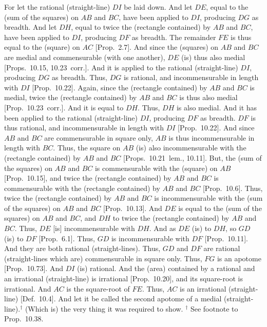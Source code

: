 For let the rational (straight-line) $DI$ be laid down. And let $DE$, equal
to the (sum of the squares) on $AB$ and $BC$, have been applied to
$DI$, producing $DG$ as breadth. And let $DH$, equal to twice the
(rectangle contained) by $AB$ and $BC$, have been applied to $DI$,
producing $DF$ as breadth. The remainder $FE$ is thus equal to the
(square) on $AC$ [Prop.~2.7]. And since the
(squares) on $AB$ and $BC$ are medial and commensurable (with one another), $DE$ (is) thus also medial [Props.~10.15, 10.23~corr.]. And it is applied to the
rational (straight-line) $DI$, producing $DG$ as breadth. Thus, $DG$
is rational, and incommensurable in length with $DI$ [Prop.~10.22].  Again, since the (rectangle contained)
by $AB$ and $BC$ is medial, twice the (rectangle contained) by $AB$
and $BC$ is thus also medial [Prop.~10.23~corr.]. 
And it is equal to $DH$. Thus, $DH$ is also medial. And it has been
applied to the rational (straight-line) $DI$, producing $DF$ as breadth.
$DF$ is thus rational, and incommensurable in length with $DI$
[Prop.~10.22].  And since $AB$ and $BC$ are commensurable in square only, $AB$ is thus incommensurable in length
with $BC$. Thus, the square on $AB$ (is) also incommensurable
with the (rectangle contained) by $AB$ and $BC$ [Props.~10.21~lem.,
10.11]. But, the (sum of the squares) on $AB$ and $BC$  is commensurable with the (square) on $AB$  [Prop.~10.15], and twice the (rectangle contained)
by $AB$ and $BC$ is commensurable with the (rectangle contained)
by $AB$ and $BC$ [Prop.~10.6]. Thus, twice
the (rectangle contained) by $AB$ and $BC$ is incommensurable
with the (sum of the squares) on $AB$ and $BC$ [Prop.~10.13]. And $DE$ is equal
to the (sum of the squares) on $AB$ and $BC$, and $DH$ to
twice the (rectangle contained) by $AB$ and $BC$. Thus, $DE$
[is] incommensurable with $DH$. And as $DE$ (is) to $DH$, so
$GD$ (is) to $DF$ [Prop.~6.1]. Thus,
$GD$ is incommensurable with $DF$ [Prop.~10.11]. And they are both rational (straight-lines). Thus, $GD$ and $DF$ are rational (straight-lines which are)
commensurable in square only.
Thus, $FG$ is an apotome [Prop.~10.73]. 
And $DI$ (is) rational. And the (area) contained by a rational and
an irrational (straight-line) is irrational [Prop.~10.20], and its square-root 
is irrational. And $AC$ is the square-root of $FE$. Thus, $AC$ is an
irrational (straight-line) [Def.~10.4]. And
let it be called the second apotome of a medial (straight-line).$^\dag$
(Which is) the very thing it
was required to show.
{\footnotesize\noindent$^\dag$ See footnote to Prop.~10.38.} 

